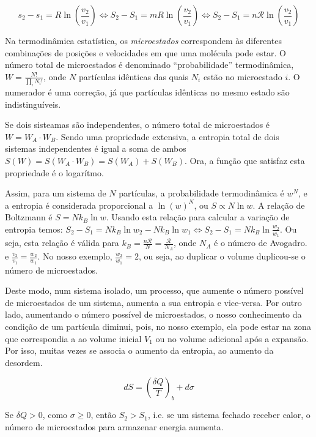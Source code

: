 \begin{equation*}
    s_2 - s_1 = R \ln \left(\frac{v_2}{v_1}\right) \Longleftrightarrow S_2 - S_1 = m R \ln \left(\frac{v_2}{v_1}\right)  \Longleftrightarrow S_2 - S_1 = n \mathcal{R} \ln \left(\frac{v_2}{v_1}\right) 
\end{equation*}

Na termodinâmica estatística, os \textit{microestados} correspondem às diferentes combinações de posições e velocidades em que uma molécula pode estar. O número total de microestados é denominado ``probabilidade'' termodinâmica, $W=\frac{N!}{\prod_i N_i!}$, onde $N$ partículas idênticas das quais $N_i$ estão no microestado $i$. O numerador é uma correção, já que partículas idênticas no mesmo estado são indistinguíveis.

Se dois sisteamas são independentes, o número total de microestados é $W = W_A \cdot W_B$. Sendo uma propriedade extensiva, a entropia total de dois sistemas independentes é igual a soma de ambos $S(W) = S(W_A \cdot W_B) = S(W_A) + S(W_B)$. Ora, a função que satisfaz esta propriedade é o logarítmo.

Assim, para um sistema de $N$ partículas, a probabilidade termodinâmica é $w^N$, e a entropia é considerada proporcional a $\ln(w)^N$, ou $S \propto N \ln w$. A relação de Boltzmann é $S = N k_B \ln w$. Usando esta relação para calcular a variação de entropia temos: $S_2 - S_1 = N k_B \ln w_2 - N k_B \ln w_1 \Longleftrightarrow S_2 - S_1 = N k_B \ln \frac{w_2}{w_1}$. Ou seja, esta relação é válida para $k_B = \frac{n \mathcal{R}}{N} = \frac{\mathcal{R}}{N_A}$, onde $N_A$ é o número de Avogadro. e $\frac{v_2}{v_1} = \frac{w_2}{w_1}$. No nosso exemplo, $\frac{w_2}{w_1} = 2$, ou seja, ao duplicar o volume duplicou-se o número de microestados.

Deste modo, num sistema isolado, um processo, que aumente o número possível de microestados de um sistema, aumenta a sua entropia e vice-versa. Por outro lado, aumentando o número possível de microestados, o nosso conhecimento da condição de um partícula diminui, pois, no nosso exemplo, ela pode estar na zona que correspondia a ao volume inicial $V_1$ ou no volume adicional após a expansão. Por isso, muitas vezes se associa o aumento da entropia, ao aumento da desordem.

\begin{equation*}
    dS = \left( \frac{\delta Q}{T}  \right)_b + d\sigma
\end{equation*}

Se $\delta Q > 0$, como $\sigma \geq 0$, então $S_2 > S_1$, i.e. se um sistema fechado receber calor, o número de microestados para armazenar energia aumenta. 


